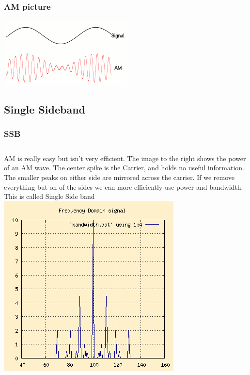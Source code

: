 \documentclass[10pt, handout]{beamer}
\begin{document}
\begin{frame}
\frametitle{AM picture}
\includegraphics[height=.5\textheight]{am.png}
\end{frame}

\subsection{Single Sideband}

\begin{frame}
\frametitle{SSB }
\begin{columns}
AM is really easy but isn't very efficient. The image to the right shows the power of an AM wave. The center spike is the Carrier, and holds no useful information. The smaller peaks on either side are mirrored across the carrier. If we remove everything but on of the sides we can more efficiently use power and bandwidth. This is called Single Side band
\includegraphics[width=\textwidth]{amfft.png}
\end{columns}
\end{frame}
\end{document}
